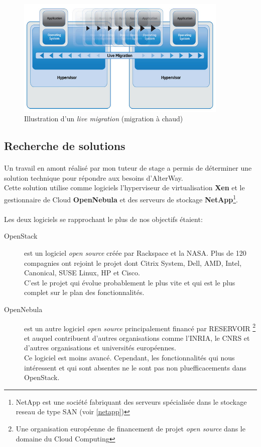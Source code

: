 \begin{figure}[h]
\centering
\includegraphics[width=0.9\textwidth]{resource/img/live-migration}
\caption{Illustration d'un \emph{live migration} (migration à chaud)}
\label{livemigration}
\end{figure}

\subsection{Recherche de solutions}
\paragraph*{}
Un travail en amont réalisé par mon tuteur de stage a permis de déterminer une solution technique pour répondre aux besoins d'AlterWay.\\
Cette solution utilise comme logiciels l'hyperviseur de virtualisation \textbf{Xen} et le gestionnaire de Cloud \textbf{OpenNebula} et des
serveurs de stockage \textbf{NetApp}\footnote{NetApp est une société fabriquant des serveurs spécialisée dans le stockage reseau de type SAN (voir \ref{netapp})}.


\paragraph*{}
Les deux logiciels se rapprochant le plus de nos objectifs étaient:
\begin{description}
	\item[OpenStack]  est un logiciel \emph{open source} créée par Rackspace et la NASA. Plus de 120 compagnies ont rejoint le projet dont Citrix System, Dell, AMD, Intel,
		Canonical, SUSE Linux, HP et Cisco.\\
		C'est le projet qui évolue probablement le plus vite et qui est le plus complet sur le plan des fonctionnalités.
	\item[OpenNebula]  est un autre logiciel \emph{open source} principalement financé par RESERVOIR
	\footnote{Une organisation européenne de financement de projet \emph{open source} dans le domaine du Cloud Computing} et auquel contribuent d'autres organisations
	comme l'INRIA, le CNRS et d'autres organisations et universités européennes.\\
	Ce logiciel est moins avancé. Cependant, les fonctionnalités qui nous intéressent et qui sont absentes ne le sont pas non pluefficacements dans OpenStack.
\end{description}


